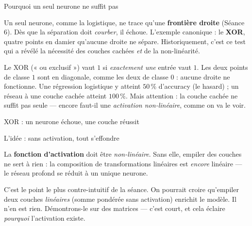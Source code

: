\documentclass[aspectratio=169,11pt]{beamer}
\begin{document}
\begin{frame}{Pourquoi un seul neurone ne suffit pas}
\begin{ucadfront}
{\small Un seul neurone, comme la logistique, ne trace qu'une \textbf{frontière droite} (Séance 6). Dès que la séparation doit \emph{courber}, il échoue. L'exemple canonique : le \textbf{XOR}, quatre points en damier qu'aucune droite ne sépare. Historiquement, c'est ce test qui a révélé la nécessité des couches cachées \emph{et} de la non-linéarité.}
\end{ucadfront}
{\small Le XOR (« ou exclusif ») vaut $1$ si \emph{exactement une} entrée vaut $1$. Les deux points de classe $1$ sont en diagonale, comme les deux de classe $0$ : aucune droite ne fonctionne. Une régression logistique y atteint $50\,\%$ d'accuracy (le hasard) ; un réseau à une couche cachée atteint $100\,\%$. Mais attention : la couche cachée ne suffit pas seule — encore faut-il une \emph{activation non-linéaire}, comme on va le voir.}
\end{frame}

\begin{frame}{XOR : un neurone échoue, une couche réussit}
\end{frame}

\begin{frame}{L'idée : sans activation, tout s'effondre}
\begin{ucaddef}
{\small La \textbf{fonction d'activation} doit être \emph{non-linéaire}. Sans elle, empiler des couches ne sert à rien : la composition de transformations linéaires est \emph{encore} linéaire — le réseau profond se réduit à un unique neurone.}
\end{ucaddef}
{\small C'est le point le plus contre-intuitif de la séance. On pourrait croire qu'empiler deux couches \emph{linéaires} (somme pondérée sans activation) enrichit le modèle. Il n'en est rien. Démontrons-le sur des matrices — c'est court, et cela éclaire \emph{pourquoi} l'activation existe.}
\end{frame}
\end{document}
